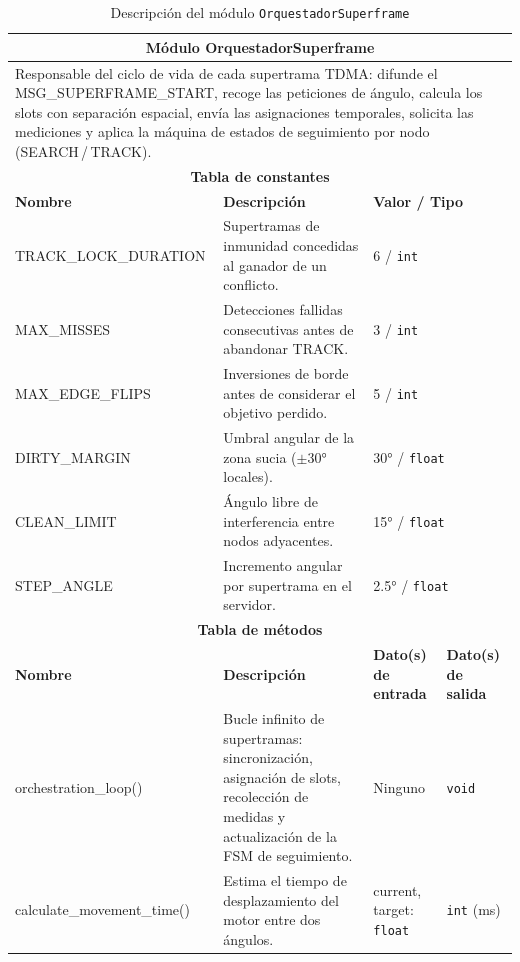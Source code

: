 \begin{table}[h!]
\centering
\small
\renewcommand{\arraystretch}{1.25}
\begin{tabular}{|p{2.8cm}|p{5.5cm}|p{2.8cm}|p{1.7cm}|}
\hline
\multicolumn{4}{|c|}{\textbf{Módulo OrquestadorSuperframe}} \\
\hline
\multicolumn{4}{|p{12.8cm}|}{Responsable del ciclo de vida de cada supertrama TDMA:
difunde el MSG\_SUPERFRAME\_START, recoge las peticiones de ángulo, calcula los
slots con separación espacial, envía las asignaciones temporales, solicita las
mediciones y aplica la máquina de estados de seguimiento por nodo
(SEARCH\,/\,TRACK).} \\
\hline
\multicolumn{4}{|c|}{\textbf{Tabla de constantes}} \\
\hline
\textbf{Nombre} & \textbf{Descripción} & \multicolumn{2}{l|}{\textbf{Valor / Tipo}} \\
\hline
TRACK\_LOCK\_DURATION & Supertramas de inmunidad concedidas al ganador de un conflicto. & \multicolumn{2}{l|}{6 / \texttt{int}} \\
\hline
MAX\_MISSES & Detecciones fallidas consecutivas antes de abandonar TRACK. & \multicolumn{2}{l|}{3 / \texttt{int}} \\
\hline
MAX\_EDGE\_FLIPS & Inversiones de borde antes de considerar el objetivo perdido. & \multicolumn{2}{l|}{5 / \texttt{int}} \\
\hline
DIRTY\_MARGIN & Umbral angular de la zona sucia ($\pm$30° locales). & \multicolumn{2}{l|}{30° / \texttt{float}} \\
\hline
CLEAN\_LIMIT & Ángulo libre de interferencia entre nodos adyacentes. & \multicolumn{2}{l|}{15° / \texttt{float}} \\
\hline
STEP\_ANGLE & Incremento angular por supertrama en el servidor. & \multicolumn{2}{l|}{2.5° / \texttt{float}} \\
\hline
\multicolumn{4}{|c|}{\textbf{Tabla de métodos}} \\
\hline
\textbf{Nombre} & \textbf{Descripción} & \textbf{Dato(s) de entrada} & \textbf{Dato(s) de salida} \\
\hline
orchestration\_loop() & Bucle infinito de supertramas: sincronización, asignación de slots, recolección de medidas y actualización de la FSM de seguimiento. & Ninguno & \texttt{void} \\
\hline
calculate\_movement\_time() & Estima el tiempo de desplazamiento del motor entre dos ángulos. & current, target: \texttt{float} & \texttt{int} (ms) \\
\hline
\end{tabular}
\caption{Descripción del módulo \texttt{OrquestadorSuperframe}}
\label{tab:module_orquestador}
\end{table}

